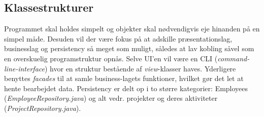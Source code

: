 \subsection{Klassestrukturer} 
Programmet skal holdes simpelt og objekter skal nødvendigvis eje hinanden på en simpel måde. Desuden vil der være fokus på at adskille præsentationslag, businesslag og persistency så meget som muligt, således at lav kobling såvel som en overskuelig programstruktur opnås. Selve UI'en vil være en CLI (\textit{command-line-interface}) hvor en struktur bestående af \textit{view}-klasser haves. Yderligere benyttes \textit{facades} til at samle business-lagets funktioner, hvilket gør det let at hente bearbejdet data. Persistency er delt op i to større kategorier: Employees (\textit{EmployeeRepository.java}) og alt vedr. projekter og deres aktiviteter (\textit{ProjectRepository.java}).